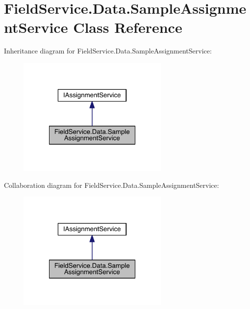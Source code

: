 \hypertarget{class_field_service_1_1_data_1_1_sample_assignment_service}{\section{Field\+Service.\+Data.\+Sample\+Assignment\+Service Class Reference}
\label{class_field_service_1_1_data_1_1_sample_assignment_service}
}


Inheritance diagram for Field\+Service.\+Data.\+Sample\+Assignment\+Service\+:
\nopagebreak
\begin{figure}[H]
\begin{center}
\leavevmode
\includegraphics[width=210pt]{class_field_service_1_1_data_1_1_sample_assignment_service__inherit__graph}
\end{center}
\end{figure}


Collaboration diagram for Field\+Service.\+Data.\+Sample\+Assignment\+Service\+:
\nopagebreak
\begin{figure}[H]
\begin{center}
\leavevmode
\includegraphics[width=210pt]{class_field_service_1_1_data_1_1_sample_assignment_service__coll__graph}
\end{center}
\end{figure}

